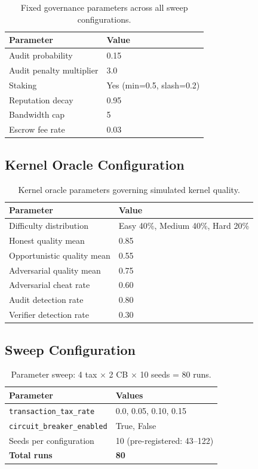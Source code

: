 \documentclass[11pt]{article}
\begin{document}
\begin{table}[H]
\centering
\caption{Fixed governance parameters across all sweep configurations.}
\small
\begin{tabular}{@{}ll@{}}
\toprule
Parameter & Value \\
\midrule
Audit probability & 0.15 \\
Audit penalty multiplier & 3.0 \\
Staking & Yes (min=0.5, slash=0.2) \\
Reputation decay & 0.95 \\
Bandwidth cap & 5 \\
Escrow fee rate & 0.03 \\
\bottomrule
\end{tabular}
\end{table}

\subsection{Kernel Oracle Configuration}

\begin{table}[H]
\centering
\caption{Kernel oracle parameters governing simulated kernel quality.}
\small
\begin{tabular}{@{}ll@{}}
\toprule
Parameter & Value \\
\midrule
Difficulty distribution & Easy 40\%, Medium 40\%, Hard 20\% \\
Honest quality mean & 0.85 \\
Opportunistic quality mean & 0.55 \\
Adversarial quality mean & 0.75 \\
Adversarial cheat rate & 0.60 \\
Audit detection rate & 0.80 \\
Verifier detection rate & 0.30 \\
\bottomrule
\end{tabular}
\end{table}

\subsection{Sweep Configuration}

\begin{table}[H]
\centering
\caption{Parameter sweep: 4 tax $\times$ 2 CB $\times$ 10 seeds = 80 runs.}
\small
\begin{tabular}{@{}ll@{}}
\toprule
Parameter & Values \\
\midrule
\texttt{transaction\_tax\_rate} & 0.0, 0.05, 0.10, 0.15 \\
\texttt{circuit\_breaker\_enabled} & True, False \\
Seeds per configuration & 10 (pre-registered: 43--122) \\
\textbf{Total runs} & \textbf{80} \\
\bottomrule
\end{tabular}
\end{table}
\end{document}
